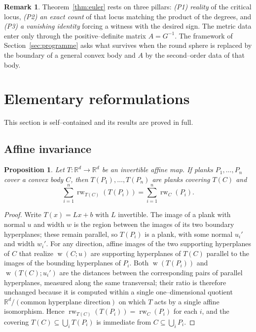 \documentclass[11pt,reqno]{amsart}
\theoremstyle{plain}
\newtheorem{proposition}[theorem]{Proposition}
\theoremstyle{definition}
\newtheorem{remark}[theorem]{Remark}
\newcommand{\R}{\mathbb{R}}
\newcommand{\relw}{\operatorname{rw}}
\newcommand{\wid}{\operatorname{w}}
\begin{document}
\begin{remark}\label{rem:threepillars}
Theorem~\ref{thm:euler} rests on three pillars: \emph{(P1) reality} of the
critical locus, \emph{(P2) an exact count} of that locus matching the product of
the degrees, and \emph{(P3) a vanishing identity} forcing a witness with the
desired sign. The metric data enter only through the positive--definite matrix
$A=G^{-1}$. The framework of Section~\ref{sec:programme} asks what survives when
the round sphere is replaced by the boundary of a general convex body and $A$ by
the second--order data of that body.
\end{remark}

\section{Elementary reformulations}\label{sec:dictionary}

This section is self--contained and its results are proved in full.

\subsection{Affine invariance}
\begin{proposition}\label{prop:affineinv}
Let $T:\R^d\to\R^d$ be an invertible affine map. If planks $P_1,\dots,P_n$ cover a
convex body $C$, then $T(P_1),\dots,T(P_n)$ are planks covering $T(C)$ and
\[
\sum_{i=1}^n\relw_{T(C)}(T(P_i))=\sum_{i=1}^n\relw_{C}(P_i).
\]
\end{proposition}

\begin{proof}
Write $T(x)=Lx+b$ with $L$ invertible. The image of a plank with normal $u$ and
width $w$ is the region between the images of its two boundary hyperplanes; these
remain parallel, so $T(P_i)$ is a plank, with some normal $u_i'$ and width
$w_i'$. For any direction, affine images of the two supporting hyperplanes of
$C$ that realize $\wid(C;u)$ are supporting hyperplanes of $T(C)$ parallel to the
images of the bounding hyperplanes of $P_i$. Both $\wid(T(P_i))$ and
$\wid(T(C);u_i')$ are the distances between the corresponding pairs of parallel
hyperplanes, measured along the same transversal; their ratio is therefore
unchanged because it is computed within a single one--dimensional quotient
$\R^d/(\text{common hyperplane direction})$ on which $T$ acts by a single affine
isomorphism. Hence $\relw_{T(C)}(T(P_i))=\relw_{C}(P_i)$ for each $i$, and the
covering $T(C)\subseteq\bigcup_i T(P_i)$ is immediate from
$C\subseteq\bigcup_i P_i$.
\end{proof}
\end{document}
